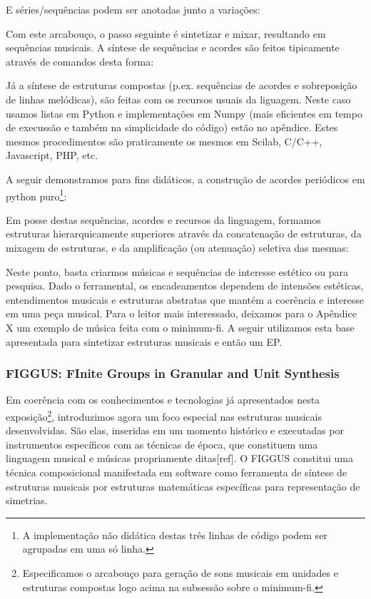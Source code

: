 E séries/sequências podem ser anotadas junto a variações:


Com este arcabouço, o passo seguinte é sintetizar e mixar, resultando
em sequências musicais. A síntese de sequências e acordes são feitos tipicamente
através de comandos desta forma:


Já a síntese de estruturas compostas (p.ex. sequências de acordes e sobreposição
de linhas melódicas), são feitas com os recursos usuais da liguagem. Neste caso
usamos listas em Python e implementações em Numpy (mais eficientes em tempo de
execussão e também na simplicidade do código) estão no apêndice. Estes mesmos
procedimentos são praticamente os mesmos em Scilab, C/C++, Javascript, PHP, etc.

A seguir demonstramos para fins didáticos, a construção de acordes periódicos em
python puro\footnote{A implementação não didática destas três linhas de código
podem ser agrupadas em uma só linha.}:


Em posse destas sequências, acordes e recursos da linguagem,
formamos estruturas hierarquicamente superiores
através da concatenação de estruturas, da mixagem de estruturas, e da amplificação
(ou atenuação) seletiva das mesmas:


Neste ponto, basta criarmos músicas e sequências de interesse estético ou para pesquisa. Dado o ferramental, os encadeamentos dependem de intensões estéticas, entendimentos musicais e estruturas abstratas que mantém a coerência e interesse em uma peça musical. Para o leitor mais interessado, deixamos para o Apêndice X um exemplo de música feita com o minimum-fi. A seguir utilizamos esta base apresentada para sintetizar estruturas musicais e então um EP.

\vspace{10 mm}

        \subsubsection{FIGGUS: FInite Groups in Granular and Unit Synthesis}

Em coerência com os conhecimentos
e tecnologias já apresentados nesta exposição\footnote{Especificamos o arcabouço para geração de sons musicais em unidades
e estruturas compostas logo acima na subsessão sobre o minimum-fi.}, introduzimos agora
um foco especial nas estruturas musicais
desenvolvidas. São elas, inseridas em um momento histórico e
executadas por instrumentos específicos com as técnicas de época,
que constituem uma linguagem musical e músicas propriamente
ditas[ref]. O FIGGUS constitui uma técnica composicional
manifestada em software como ferramenta de síntese de
estruturas musicais por estruturas matemáticas específicas
para representação de simetrias.


